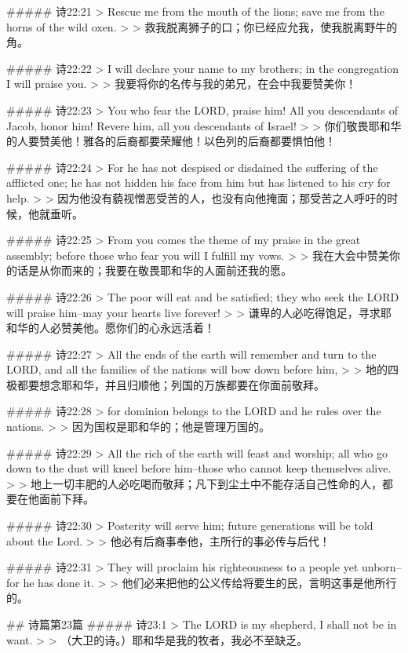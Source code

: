##### 诗22:21
> Rescue me from the mouth of the lions; save me from the horns of the wild oxen.
>
> 救我脱离狮子的口；你已经应允我，使我脱离野牛的角。


##### 诗22:22
> I will declare your name to my brothers; in the congregation I will praise you.
>
> 我要将你的名传与我的弟兄，在会中我要赞美你！


##### 诗22:23
> You who fear the LORD, praise him! All you descendants of Jacob, honor him! Revere him, all you descendants of Israel!
>
> 你们敬畏耶和华的人要赞美他！雅各的后裔都要荣耀他！以色列的后裔都要惧怕他！


##### 诗22:24
> For he has not despised or disdained the suffering of the afflicted one; he has not hidden his face from him but has listened to his cry for help.
>
> 因为他没有藐视憎恶受苦的人，也没有向他掩面；那受苦之人呼吁的时候，他就垂听。


##### 诗22:25
> From you comes the theme of my praise in the great assembly; before those who fear you will I fulfill my vows.
>
> 我在大会中赞美你的话是从你而来的；我要在敬畏耶和华的人面前还我的愿。


##### 诗22:26
> The poor will eat and be satisfied; they who seek the LORD will praise him--may your hearts live forever!
>
> 谦卑的人必吃得饱足，寻求耶和华的人必赞美他。愿你们的心永远活着！


##### 诗22:27
> All the ends of the earth will remember and turn to the LORD, and all the families of the nations will bow down before him,
>
> 地的四极都要想念耶和华，并且归顺他；列国的万族都要在你面前敬拜。


##### 诗22:28
> for dominion belongs to the LORD and he rules over the nations.
>
> 因为国权是耶和华的；他是管理万国的。


##### 诗22:29
> All the rich of the earth will feast and worship; all who go down to the dust will kneel before him--those who cannot keep themselves alive.
>
> 地上一切丰肥的人必吃喝而敬拜；凡下到尘土中不能存活自己性命的人，都要在他面前下拜。


##### 诗22:30
> Posterity will serve him; future generations will be told about the Lord.
>
> 他必有后裔事奉他，主所行的事必传与后代！


##### 诗22:31
> They will proclaim his righteousness to a people yet unborn--for he has done it.
>
> 他们必来把他的公义传给将要生的民，言明这事是他所行的。


## 诗篇第23篇
##### 诗23:1
> The LORD is my shepherd, I shall not be in want.
>
> （大卫的诗。）耶和华是我的牧者，我必不至缺乏。


